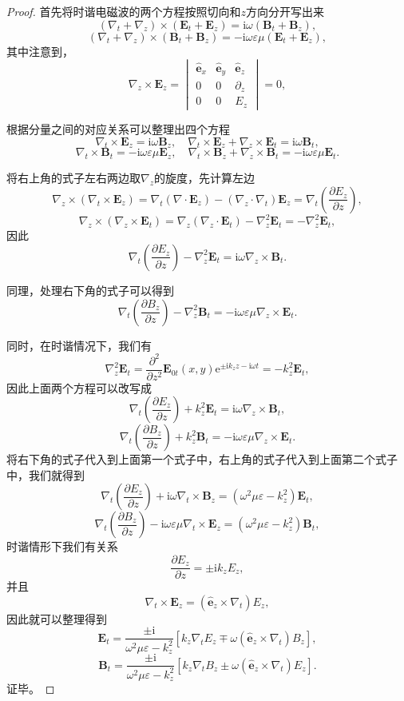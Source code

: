 \documentclass[UTF8]{ctexbook}
\newcommand{\e}{\mathrm{e}}
\renewcommand{\b}{\boldsymbol}
\renewcommand{\i}{\mathrm{i}}
\newtheorem{proof}{证明}
\numberwithin{equation}{chapter}
\begin{document}
	\begin{proof}
		首先将时谐电磁波的两个方程按照切向和$z$方向分开写出来
		\[(\nabla_t+\nabla_z)\times(\b{E}_t+\b{E}_z)=\i\omega(\b{B}_t+\b{B}_z),\]
		\[(\nabla_t+\nabla_z)\times(\b{B}_t+\b{B}_z)=-\i\omega\varepsilon\mu(\b{E}_t+\b{E}_z),\]
		其中注意到，
		\[\nabla_z\times\b{E}_z=\begin{vmatrix} \hat{\b{e}}_x & \hat{\b{e}}_y & \hat{\b{e}}_z \\ 0 & 0 & \partial_z \\ 0 & 0 & E_z \end{vmatrix}=0,\]
		
		根据分量之间的对应关系可以整理出四个方程
		\[\nabla_t\times\b{E}_z=\i\omega\b{B}_z,\quad \nabla_t\times\b{E}_z+\nabla_z\times\b{E}_t=\i\omega\b{B}_t,\]
		\[\nabla_t\times\b{B}_t=-\i\omega\varepsilon\mu\b{E}_z,\quad \nabla_t\times\b{B}_z+\nabla_z\times\b{B}_t=-\i\omega\varepsilon\mu\b{E}_t.\]
		
		将右上角的式子左右两边取$\nabla_z$的旋度，先计算左边
		\[\nabla_z\times(\nabla_t\times\b{E}_z)=\nabla_t(\nabla\cdot\b{E}_z)-(\nabla_z\cdot\nabla_t)\b{E}_z = \nabla_t\left(\frac{\partial E_z}{\partial z}\right),\]
		\[\nabla_z\times(\nabla_z\times\b{E}_t)=\nabla_z(\nabla_z\cdot\b{E}_t)-\nabla_z^2\b{E}_t=-\nabla_z^2\b{E}_t,\]
		因此
		\[\nabla_t\left(\frac{\partial E_z}{\partial z}\right) -\nabla_z^2\b{E}_t=\i\omega\nabla_z\times\b{B}_t. \]
		
		同理，处理右下角的式子可以得到
		\[\nabla_t\left(\frac{\partial B_z}{\partial z}\right)-\nabla_z^2\b{B}_t=-\i\omega\varepsilon\mu\nabla_z\times\b{E}_t.\]
		
		同时，在时谐情况下，我们有
		\[\nabla_z^2\b{E}_t=\frac{\partial^2}{\partial z^2}\b{E}_{0t}(x,y)\e^{\pm\i k_z z - \i\omega t}=-k_z^2\b{E}_t,\]
		因此上面两个方程可以改写成
		\[\nabla_t\left(\frac{\partial E_z}{\partial z}\right) +k_z^2\b{E}_t=\i\omega\nabla_z\times\b{B}_t,\]
		\[\nabla_t\left(\frac{\partial B_z}{\partial z}\right)+k_z^2\b{B}_t=-\i\omega\varepsilon\mu\nabla_z\times\b{E}_t.\]
		将右下角的式子代入到上面第一个式子中，右上角的式子代入到上面第二个式子中，我们就得到
		\[\nabla_t\left(\frac{\partial E_z}{\partial z}\right)+\i\omega\nabla_t\times\b{B}_z=(\omega^2\mu\varepsilon-k_z^2)\b{E}_t,\]
		\[\nabla_t\left(\frac{\partial B_z}{\partial z}\right)-\i\omega\varepsilon\mu\nabla_t\times\b{E}_z=(\omega^2\mu\varepsilon-k_z^2)\b{B}_t,\]
		时谐情形下我们有关系
		\[\frac{\partial E_z}{\partial z}=\pm\i k_z E_z,\]
		并且
		\[\nabla_t\times\b{E}_z=(\hat{\b{e}}_z\times\nabla_t)E_z,\]
		因此就可以整理得到
		\[\b{E}_t=\frac{\pm\i}{\omega^2\mu\varepsilon-k_z^2}\left[k_z\nabla_tE_z\mp\omega(\hat{\b{e}}_z\times\nabla_t)B_z\right],\]
		\[\b{B}_t=\frac{\pm\i}{\omega^2\mu\varepsilon-k_z^2}\left[k_z\nabla_tB_z\pm\omega(\hat{\b{e}}_z\times\nabla_t)E_z\right].\]
		证毕。
	\end{proof}
	
\end{document}
